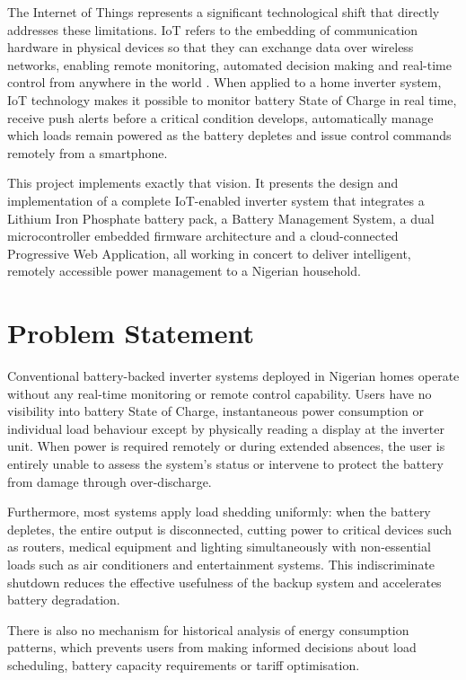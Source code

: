 \documentclass[12pt, a4paper]{report}
\begin{document}
The Internet of Things represents a significant technological shift that
directly addresses these limitations. IoT refers to the embedding of
communication hardware in physical devices so that they can exchange data
over wireless networks, enabling remote monitoring, automated decision
making and real-time control from anywhere in the world \citep{ashton2009}.
When applied to a home inverter system, IoT technology makes it possible
to monitor battery State of Charge in real time, receive push alerts
before a critical condition develops, automatically manage which loads
remain powered as the battery depletes and issue control commands remotely
from a smartphone.

This project implements exactly that vision. It presents the design and
implementation of a complete IoT-enabled inverter system that integrates a
Lithium Iron Phosphate battery pack, a Battery Management System, a dual
microcontroller embedded firmware architecture and a cloud-connected
Progressive Web Application, all working in concert to deliver
intelligent, remotely accessible power management to a Nigerian household.

\section{Problem Statement}

Conventional battery-backed inverter systems deployed in Nigerian homes
operate without any real-time monitoring or remote control capability.
Users have no visibility into battery State of Charge, instantaneous power
consumption or individual load behaviour except by physically reading a
display at the inverter unit. When power is required remotely or during
extended absences, the user is entirely unable to assess the system's
status or intervene to protect the battery from damage through over-discharge.

Furthermore, most systems apply load shedding uniformly: when the battery
depletes, the entire output is disconnected, cutting power to critical
devices such as routers, medical equipment and lighting simultaneously
with non-essential loads such as air conditioners and entertainment
systems. This indiscriminate shutdown reduces the effective usefulness of
the backup system and accelerates battery degradation.

There is also no mechanism for historical analysis of energy consumption
patterns, which prevents users from making informed decisions about load
scheduling, battery capacity requirements or tariff optimisation.
\end{document}
